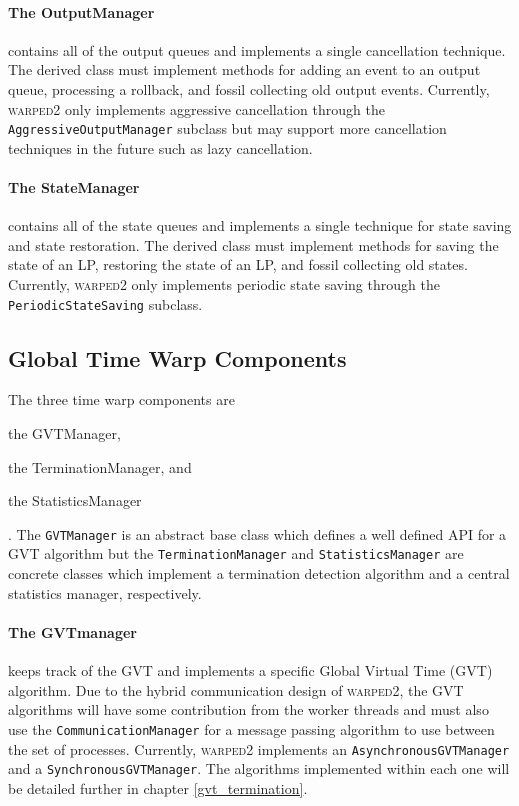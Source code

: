 \documentclass[11pt]{book}
\begin{document}
\paragraph{The OutputManager} contains all of the output queues and implements a single
cancellation technique. The derived class must implement methods for adding an event to an output queue,
processing a rollback, and fossil collecting old output events. Currently, \textsc{warped2} only
implements aggressive cancellation through the \texttt{AggressiveOutputManager} subclass but
may support more cancellation techniques in the future such as lazy cancellation.

\paragraph{The StateManager} contains all of the state queues and implements a single technique
for state saving and state restoration. The derived class must implement methods for saving the
state of an LP, restoring the state of an LP, and fossil collecting old states. Currently,
\textsc{warped2} only implements periodic state saving through the \texttt{PeriodicStateSaving}
subclass.

\subsection{Global Time Warp Components}

The three time warp components are \begin{inparaenum}[(1)] \item the GVTManager, \item
the TerminationManager, and \item the StatisticsManager \end{inparaenum}. The \texttt{GVTManager}
is an abstract base class which defines a well defined API for a GVT algorithm but the
\texttt{TerminationManager} and \texttt{StatisticsManager} are concrete classes which implement
a termination detection algorithm and a central statistics manager, respectively.

\paragraph{The GVTmanager} keeps track of the GVT and implements a specific Global Virtual Time
(GVT) algorithm. Due to the hybrid communication design of \textsc{warped2}, the GVT algorithms
will have some contribution from the worker threads and must also use the \texttt{CommunicationManager}
for a message passing algorithm to use between the set of processes. Currently, \textsc{warped2}
implements an \texttt{AsynchronousGVTManager} and a \texttt{SynchronousGVTManager}. The algorithms
implemented within each one will be detailed further in chapter \ref{gvt_termination}.
\end{document}

